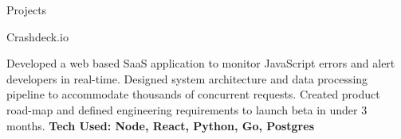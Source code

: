 \documentclass{resume}
\begin{document}
\begin{rSection}{Projects}

\begin{rSubsection}{Crashdeck.io}{}{}{}
\item Developed a web based SaaS application to monitor JavaScript errors and alert developers in real-time. Designed system architecture and data processing pipeline to accommodate thousands of concurrent requests. Created product road-map and defined engineering requirements to launch beta in under 3 months.
{\bf Tech Used: Node, React, Python, Go, Postgres}
\end{rSubsection}

\end{rSection}





\end{document}
